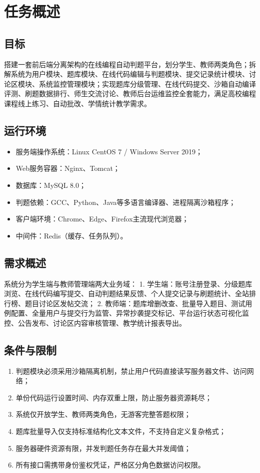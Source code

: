 \documentclass{../template/softeng}
\begin{document}
\section{任务概述}
\subsection{目标}
搭建一套前后端分离架构的在线编程自动判题平台，划分学生、教师两类角色；拆解系统为用户模块、题库模块、在线代码编辑与判题模块、提交记录统计模块、讨论区模块、系统监控管理模块；实现题库分级管理、在线代码提交、沙箱自动编译评测、刷题数据排行、师生交流讨论、教师后台运维监控全套能力，满足高校编程课程线上练习、自动批改、学情统计教学需求。

\subsection{运行环境}
\begin{itemize}
    \item 服务端操作系统：Linux CentOS 7 / Windows Server 2019；
    \item Web服务容器：Nginx、Tomcat；
    \item 数据库：MySQL 8.0；
    \item 判题依赖：GCC、Python、Java等多语言编译器、进程隔离沙箱程序；
    \item 客户端环境：Chrome、Edge、Firefox主流现代浏览器；
    \item 中间件：Redis（缓存、任务队列）。
\end{itemize}

\subsection{需求概述}
系统分为学生端与教师管理端两大业务域：
1. 学生端：账号注册登录、分级题库浏览、在线代码编写提交、自动判题结果反馈、个人提交记录与刷题统计、全站排行榜、题目讨论区发帖交流；
2. 教师端：题库增删改查、批量导入题目、测试用例配置、全量用户与提交行为监管、异常抄袭提交标记、平台运行状态可视化监控、公告发布、讨论区内容审核管理、教学统计报表导出。

\subsection{条件与限制}
\begin{enumerate}
    \item 判题模块必须采用沙箱隔离机制，禁止用户代码直接读写服务器文件、访问网络；
    \item 单份代码运行设置时间、内存双重上限，防止服务器资源耗尽；
    \item 系统仅开放学生、教师两类角色，无游客完整答题权限；
    \item 题库批量导入仅支持标准结构化文本文件，不支持自定义复杂格式；
    \item 服务器硬件资源有限，并发判题任务存在最大并发阈值；
    \item 所有接口需携带身份鉴权凭证，严格区分角色数据访问权限。
\end{enumerate}
\end{document}
